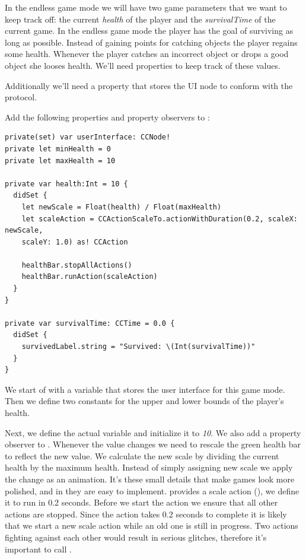 In the endless game mode we will have two game parameters that we want to keep
track off: the current \textit{health} of the player and the
\textit{survivalTime} of the current game. In the endless game mode the player
has the goal of surviving as long as possible. Instead of gaining points for
catching objects the player regains some health. Whenever the player catches an
incorrect object or drops a good object she looses health. We'll need properties
to keep track of these values.

Additionally we'll need a property that stores the UI node to conform with the
 protocol.

\begin{leftbar}
Add the following properties and property observers to
:
\begin{lstlisting}
private(set) var userInterface: CCNode!
private let minHealth = 0
private let maxHealth = 10

private var health:Int = 10 {
  didSet {
    let newScale = Float(health) / Float(maxHealth)
    let scaleAction = CCActionScaleTo.actionWithDuration(0.2, scaleX: newScale,
    scaleY: 1.0) as! CCAction
    
    healthBar.stopAllActions()
    healthBar.runAction(scaleAction)
  }
}

private var survivalTime: CCTime = 0.0 {
  didSet {
    survivedLabel.string = "Survived: \(Int(survivalTime))"
  }
}
\end{lstlisting}
\end{leftbar}
We start of with a variable that stores the user
interface for this game mode. Then we define two constants for the upper and
lower bounds of the player's health. 

Next, we define the actual  variable and initialize it to
\textit{10}. We also add a property observer to . Whenever the value changes we need to
rescale the green health bar to reflect the new value. We calculate the new
scale by dividing the current health by the maximum health. Instead of simply
assigning new scale we apply the change as an animation. It's these small
details that make games look more polished, and in \cocos{} they are easy to
implement. \cocos{} provides a scale action (), we
define it to run in 0.2 seconds. Before we start the action we ensure that all
other actions are stopped. Since the action takes 0.2 seconds to complete it is
likely that we start a new scale action while an old one is still in progress.
Two actions fighting against each other would result in serious glitches,
therefore it's important to call .

